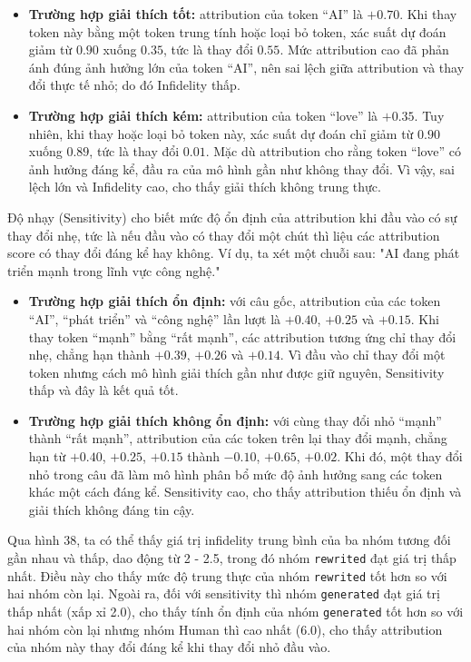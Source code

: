 \begin{itemize}
    \item \textbf{Trường hợp giải thích tốt:} attribution của token ``AI'' là $+0.70$. Khi thay token này bằng một token trung tính hoặc loại bỏ token, xác suất dự đoán giảm từ $0.90$ xuống $0.35$, tức là thay đổi $0.55$. Mức attribution cao đã phản ánh đúng ảnh hưởng lớn của token ``AI'', nên sai lệch giữa attribution và thay đổi thực tế nhỏ; do đó Infidelity thấp.
    \item \textbf{Trường hợp giải thích kém:} attribution của token ``love'' là $+0.35$. Tuy nhiên, khi thay hoặc loại bỏ token này, xác suất dự đoán chỉ giảm từ $0.90$ xuống $0.89$, tức là thay đổi $0.01$. Mặc dù attribution cho rằng token ``love'' có ảnh hưởng đáng kể, đầu ra của mô hình gần như không thay đổi. Vì vậy, sai lệch lớn và Infidelity cao, cho thấy giải thích không trung thực.
\end{itemize}

Độ nhạy (Sensitivity) cho biết mức độ ổn định của attribution khi đầu vào có sự thay đổi nhẹ, tức là nếu đầu vào có thay đổi một chút thì liệu các attribution score có thay đổi đáng kể hay không. Ví dụ, ta xét một chuỗi sau: "AI đang phát triển mạnh trong lĩnh vực công nghệ."

\begin{itemize}
    \item \textbf{Trường hợp giải thích ổn định:} với câu gốc, attribution của các token ``AI'', ``phát triển'' và ``công nghệ'' lần lượt là $+0.40$, $+0.25$ và $+0.15$. Khi thay token ``mạnh'' bằng ``rất mạnh'', các attribution tương ứng chỉ thay đổi nhẹ, chẳng hạn thành $+0.39$, $+0.26$ và $+0.14$. Vì đầu vào chỉ thay đổi một token nhưng cách mô hình giải thích gần như được giữ nguyên, Sensitivity thấp và đây là kết quả tốt.
    \item \textbf{Trường hợp giải thích không ổn định:} với cùng thay đổi nhỏ ``mạnh'' thành ``rất mạnh'', attribution của các token trên lại thay đổi mạnh, chẳng hạn từ $+0.40$, $+0.25$, $+0.15$ thành $-0.10$, $+0.65$, $+0.02$. Khi đó, một thay đổi nhỏ trong câu đã làm mô hình phân bổ mức độ ảnh hưởng sang các token khác một cách đáng kể. Sensitivity cao, cho thấy attribution thiếu ổn định và giải thích không đáng tin cậy.
\end{itemize}

Qua hình 38, ta có thể thấy giá trị infidelity trung bình của ba nhóm tương đối gần nhau và thấp, dao động từ 2 - 2.5, trong đó nhóm \texttt{rewrited} đạt giá trị thấp nhất. Điều này cho thấy mức độ trung thực của nhóm \texttt{rewrited} tốt hơn so với hai nhóm còn lại. Ngoài ra, đối với sensitivity thì nhóm \texttt{generated} đạt giá trị thấp nhất (xấp xỉ 2.0), cho thấy tính ổn định của nhóm \texttt{generated} tốt hơn so với hai nhóm còn lại nhưng
nhóm Human thì cao nhất (6.0), cho thấy attribution của nhóm này thay đổi đáng kể khi thay đổi nhỏ đầu vào.

